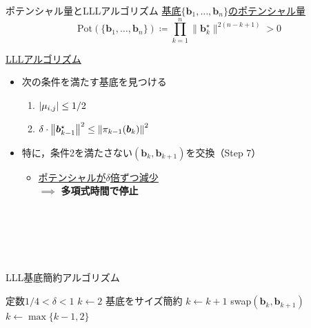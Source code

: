 \documentclass[12pt,aspectratio=169,xcolor=dvipsnames,table,dvipdfmx, leqno]{beamer}
\begin{document}
\begin{frame}{ポテンシャル量とLLLアルゴリズム}
\uline{基底$\{\bm{b}_1,\ldots,\bm{b}_n\}$の\alert{ポテンシャル量}}
\[\textstyle\mathrm{Pot}(\{\bm{b}_1,\ldots,\bm{b}_n\}) \coloneqq \prod_{k=1}^{n} \| \bm{b}_k^\star \|^{2(n-k+1)} > 0\]
\vspace{-14pt}
\begin{minipage}[b]{0.45\columnwidth}
    \uline{LLLアルゴリズム}\cite{LLL82}
    \begin{itemize}
        \item 次の条件を満たす基底を見つける
        \begin{enumerate}
            \item
            $\abs{\mu_{i, j}}\le 1/2$
            \item
            $\delta\cdot \norm{\bm{b}_{k-1}^\star}^2\le\norm{\pi_{k-1}(\bm{b}_k)}^2$
        \end{enumerate}
        \item 特に，条件2を満たさない$(\bm{b}_k, \bm{b}_{k+1})$を交換（Step 7）
        \begin{itemize}
            \item \uline{ポテンシャルが$\delta$倍ずつ減少} \\
            $\implies$ \alert{\textbf{多項式時間で停止}}
        \end{itemize}
    \end{itemize}
    \mbox{}\\
    \mbox{}\\
    \mbox{}\\
    \mbox{}\\
\end{minipage}
\hspace{0.03\columnwidth}
\begin{minipage}[b]{0.45\columnwidth}
    \begin{algorithm}[H]
    \footnotesize
        \begin{algorithmic}[1]
            \caption{\footnotesize LLL基底簡約アルゴリズム\cite{LLL82}}
            \label{alg_LLL}
            \Statex 定数$1/4<\delta<1$
            \State $k \gets 2$
                \State 基底をサイズ簡約\cite{Hermite1850}
                    \State $k\gets k+1$
                \Else
                    \State swap$(\bm{b}_k, \bm{b}_{k+1})$
                    \State $k\gets\max\{k-1, 2\}$
                \EndIf
            \EndWhile
        \end{algorithmic}
    \end{algorithm}
    \mbox{}\\
\end{minipage}
\end{frame}
\end{document}
